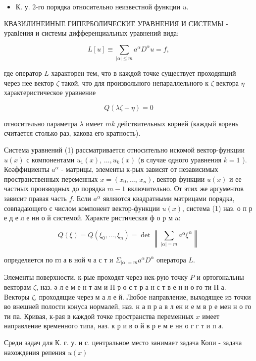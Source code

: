 \documentclass[10pt]{article}
\begin{document}
\begin{itemize}

  \item К. у. 2-го порядка относительно неизвестной функции $u$.

\end{itemize}



КВАЗИЛИНЕИНЫЕ ГИПЕРБОЛИЧЕСКИЕ УРАВНЕНИЯ И СИСТЕМЫ - уравІения и системы дифференциальных уравнений вида:



\[

L[u] \equiv \sum_{|\alpha| \leqslant m} a^{\alpha} D^{\alpha} u=f,

\]



где оператор $L$ характөрен тем, что в каждой точке существует проходяпций через нее вектор $\zeta$ такой, что для произвольного непараллельного к $\zeta$ вектора $\eta$ характеристическое уравнение



\[

Q(\lambda \zeta+\eta)=0

\]



относительно параметра $\lambda$ имеет $m k$ действительных корней (каждый корень считается столько раз, какова его кратность).



Система уравнений (1) рассматривается относительно искомой вектор-функции $u(x)$ с компонентами $u_{1}(x)$, $\ldots, u_{k}(x)$ (в случае одного уравнения $k=1$ ). Коәффициенты $a^{\alpha}$ - матрицы, элементы к-рых зависят от независимых пространственных переменных $x=\left(x_{0}, \ldots\right.$, $\left.x_{n}\right)$, вектор-функции $u(x)$ и ее частных производных до порядка $m-1$ включительно. От этих же аргументов зависит правая часть $f$. Если $a^{\alpha}$ являются квадратными матрицами порядка, совпадающего с числом компонент вектор-функции $u(x)$, система (1) наз. о п р е д е л е нн о й системой. Характе ристическая ф о р м a:



\[

Q(\xi)=Q\left(\xi_{0}, \ldots, \xi_{n}\right)=\operatorname{det}\left\|\sum_{|\alpha|=m} a^{\alpha} \xi^{\alpha}\right\|

\]



определяется по гл а в ной ч а с т и $\Sigma_{|\alpha|=m} a^{\alpha} D^{\alpha}$ оператора $L$.



Элементы поверхности, к-рые проходят через нек-рую точку $P$ и ортогональны векторам $\zeta$, наз. ә л е м е н т ам и П р о с т р а н с т в е н н о го ти П а. Векторы $\zeta$, проходящие через м а л е й. Любое направление, выходящее из точки во внешней полости конуса нормалей, наз. н а п р а в л ен и е м в р е мен н о го ти па. Кривая, к-рая в каждой точке пространства переменных $x$ имеет направление временного типа, наз. к р и в о й в р е м е нн о г г т и п а.



Среди задач для К. г. у. и с. центральное место занимает задача Копи - задача нахождения репения $u(x)$
\end{document}
